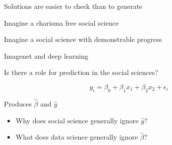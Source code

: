 \documentclass[aspectratio=169]{beamer}
\begin{document}
\begin{frame}

{\Large
\begin{center}
Solutions are easier to check than to generate
\end{center}
}

\end{frame}
\begin{frame}

{\Large
\begin{center}
Imagine a charisma free social science
\end{center}
}

\end{frame}
\begin{frame}

{\Large
\begin{center}
Imagine a social science with demonstrable progress
\end{center}
}

\end{frame}
\begin{frame}

{\Large
\begin{center}
Imagenet and deep learning
\end{center}
}

\end{frame}
\begin{frame}

{\Large
\begin{center}
Is there a role for prediction in the social sciences?
\end{center}
}

\end{frame}
\begin{frame}

$$y_i = \beta_0 + \beta_1 x_1 + \beta_2 x_2 + \epsilon_i$$

\pause

Produces $\hat{\beta}$ and $\hat{y}$\\

\begin{itemize}
\item Why does social science generally ignore $\hat{y}$?  
\item What does data science generally ignore $\hat{\beta}$?
\end{itemize}

\end{frame}
\end{document}
